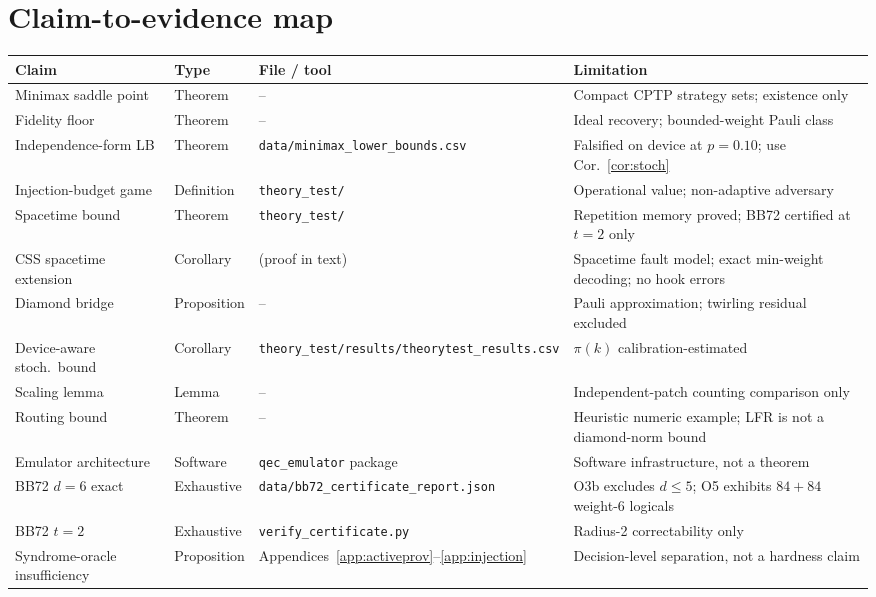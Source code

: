 \documentclass[11pt,a4paper]{article}
\begin{document}
\section*{Claim-to-evidence map}
\begin{table}[H]\centering\scriptsize
\setlength{\tabcolsep}{3pt}
\renewcommand{\arraystretch}{1.08}
\begin{tabularx}{\textwidth}{@{}p{3.1cm}p{1.7cm}X p{2.9cm}@{}}
\toprule Claim & Type & File / tool & Limitation \\\midrule
Minimax saddle point & Theorem & -- & Compact CPTP strategy sets; existence only \\
Fidelity floor & Theorem & -- & Ideal recovery; bounded-weight Pauli class \\
Independence-form LB & Theorem & \texttt{data/minimax\_lower\_bounds.csv} & Falsified on device at $p{=}0.10$; use Cor.~\ref{cor:stoch} \\
Injection-budget game & Definition & \texttt{theory\_test/} & Operational value; non-adaptive adversary \\
Spacetime bound & Theorem & \texttt{theory\_test/} & Repetition memory proved; BB72 certified at $t{=}2$ only \\
CSS spacetime extension & Corollary & (proof in text) & Spacetime fault model; exact min-weight decoding; no hook errors \\
Diamond bridge & Proposition & -- & Pauli approximation; twirling residual excluded \\
Device-aware stoch.\ bound & Corollary & \texttt{theory\_test/results/theorytest\_results.csv} & $\pi(k)$ calibration-estimated \\
Scaling lemma & Lemma & -- & Independent-patch counting comparison only \\
Routing bound & Theorem & -- & Heuristic numeric example; LFR is not a diamond-norm bound \\
Emulator architecture & Software & \texttt{qec\_emulator} package & Software infrastructure, not a theorem \\
BB72 $d=6$ exact & Exhaustive & \texttt{data/bb72\_certificate\_report.json} & O3b excludes $d\le5$; O5 exhibits $84+84$ weight-6 logicals \\
BB72 $t=2$ & Exhaustive & \texttt{verify\_certificate.py} & Radius-2 correctability only \\
Syndrome-oracle insufficiency & Proposition & Appendices~\ref{app:activeprov}--\ref{app:injection} & Decision-level separation, not a hardness claim \\

\end{tabularx}
\end{table}
\end{document}
